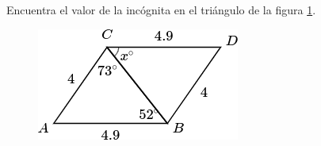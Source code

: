 Encuentra el valor de la incógnita en el triángulo de la figura \ref{fig:angle_triangle_06}.

\begin{minipage}[t][][t]{0.35\textwidth}
    \begin{figure}[H]
        \centering
        \includegraphics[width=0.9\linewidth]{../images/angle_triangle_06.png}

        \caption{}
        \label{fig:angle_triangle_06}
    \end{figure}
\end{minipage}\hfill
\begin{minipage}[t][][t]{0.6\textwidth}
    \begin{solutionbox}{4.5cm}

    \end{solutionbox}
\end{minipage}

